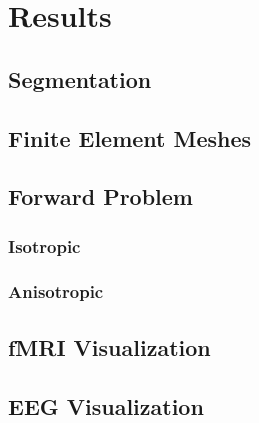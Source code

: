 %

\section{Results}
\label{sec:results}

\subsection{Segmentation}

\subsection{Finite Element Meshes}

\subsection{Forward Problem}

\subsubsection{Isotropic}

\subsubsection{Anisotropic}

\subsection{fMRI Visualization}

\subsection{EEG Visualization}




